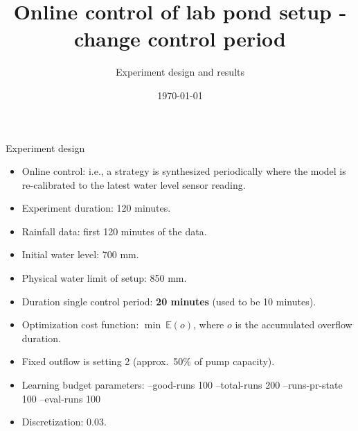 \documentclass[notheorems,aspectratio=169]{beamer}
\title{Online control of lab pond setup - change control period}
\subtitle{Experiment design and results}
\date{\today}
\begin{document}
%
\begin{frame}
	\titlepage
\end{frame}
%

\begin{frame}{Experiment design}
	\small
	\begin{itemize}
		\item Online control: i.e., a strategy is synthesized periodically where the model is re-calibrated to the latest water level sensor reading.
		\item Experiment duration: 120 minutes.
		\item Rainfall data: first 120 minutes of the data.
		\item Initial water level: 700 mm.
		\item Physical water limit of setup: 850 mm.
		\item Duration single control period: \textbf{20 minutes} (used to be 10 minutes).
		\item Optimization cost function: $\min\  \mathbb{E}(o)$, where $o$ is the accumulated overflow duration.
		\item Fixed outflow is setting 2 (approx.\ 50\% of pump capacity).
		\item Learning budget parameters: --good-runs 100 --total-runs 200 --runs-pr-state 100 --eval-runs 100 
		\item Discretization: 0.03.
	\end{itemize}
\end{frame}
\end{document}

